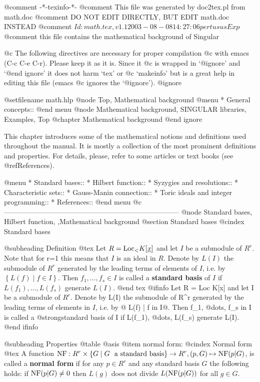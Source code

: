 @comment -*-texinfo-*-
@comment This file was generated by doc2tex.pl from math.doc
@comment DO NOT EDIT DIRECTLY, BUT EDIT math.doc INSTEAD
@comment $Id: math.tex,v 1.1 2003-08-08 14:27:06 pertusus Exp $
@comment this file contains the mathematical background of Singular

@c The following directives are necessary for proper compilation
@c with emacs (C-c C-e C-r).  Please keep it as it is.  Since it
@c is wrapped in `@ignore' and `@end ignore' it does not harm `tex' or
@c `makeinfo' but is a great help in editing this file (emacs
@c ignores the `@ignore').
@ignore

@setfilename math.hlp
@node Top, Mathematical background
@menu
* General concepts::
@end menu
@node Mathematical background, SINGULAR libraries, Examples, Top
@chapter Mathematical background
@end ignore

This chapter introduces some of the mathematical notions and definitions used
throughout the manual. It is mostly a collection of the
most prominent definitions and properties. For details, please, refer to
some articles or text books (see @ref{References}).

@menu
* Standard bases::
* Hilbert function::
* Syzygies and resolutions::
* Characteristic sets::
* Gauss-Manin connection::
* Toric ideals and integer programming::
* References::
@end menu
@c ---------------------------------------------------------------------------
@node Standard bases, Hilbert function, ,Mathematical background
@section Standard bases
@cindex Standard bases

@subheading Definition
@tex
Let $R = \hbox{Loc}_< K[\underline{x}]$ and let $I$ be a submodule of $R^r$.
Note that for r=1 this means that $I$ is an ideal in $R$.
Denote by $L(I)$ the submodule of $R^r$ generated by the leading terms 
of elements of $I$, i.e. by $\left\{L(f) \mid f \in I\right\}$.
Then $f_1, \ldots, f_s \in I$ is called a {\bf standard basis} of $I$ 
if $L(f_1), \ldots, L(f_s)$ generate $L(I)$.
@end tex
@ifinfo
Let R = Loc K[x] and let I be a submodule of $R^r$.
Denote by L(I) the submodule of R^r generated by the leading terms 
of elements in $I$, i.e. by @{ L(f) | f in I@}.
Then f_1, @dots{}, f_s in I is called a @strong{standard basis} of I 
if L(f_1), @dots{}, L(f_s) generate L(I).
@end ifinfo

@subheading Properties
@table @asis
@item normal form:
@cindex Normal form
@tex
A function $\hbox{NF} : R^r \times \{G \mid G\ \hbox{ a standard
basis}\} \to R^r, (p,G) \mapsto \hbox{NF}(p|G)$, is called a {\bf normal
form} if for any $p \in R^r$ and any standard basis $G$ the following
holds: if $\hbox{NF}(p|G) \not= 0$ then $L(g)$ does not divide
$L(\hbox{NF}(p|G))$ for all $g \in G$.

